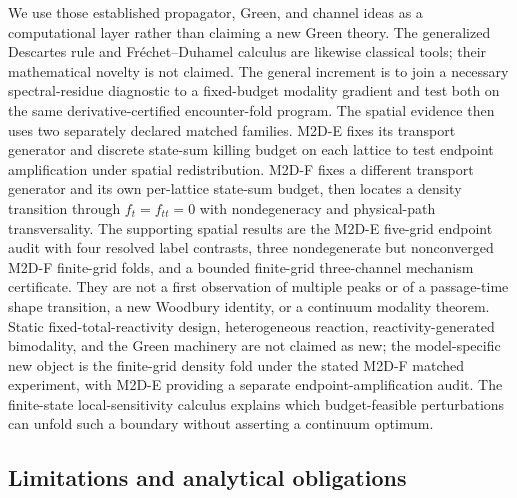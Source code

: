 \documentclass[aps,pre,reprint,amsmath,amssymb,longbibliography,floatfix]{revtex4-2}
\begin{document}
We use those established propagator, Green, and channel ideas as a
computational layer rather than claiming a new Green theory. The generalized
Descartes rule and Fr\'echet--Duhamel calculus are likewise classical tools;
their mathematical novelty is not claimed. The general increment is to join a
necessary spectral-residue diagnostic to a fixed-budget modality gradient and
test both on the same derivative-certified encounter-fold program. The
spatial evidence then uses two separately declared matched families. M2D-E fixes its
transport generator and discrete state-sum killing budget on each lattice to
test endpoint amplification under spatial redistribution. M2D-F fixes a
different transport generator and its own per-lattice state-sum budget, then
locates a density transition through
\(f_t=f_{tt}=0\) with nondegeneracy and physical-path transversality. The
supporting spatial results are the M2D-E five-grid endpoint audit with four
resolved label contrasts, three nondegenerate but nonconverged M2D-F
finite-grid folds, and a bounded finite-grid three-channel mechanism
certificate. They are not a first
observation of multiple peaks or of a passage-time shape transition, a new
Woodbury identity, or a continuum modality theorem. Static
fixed-total-reactivity design, heterogeneous reaction,
reactivity-generated bimodality, and the Green machinery are not claimed as
new; the model-specific new object is the finite-grid density fold under the
stated M2D-F matched experiment, with M2D-E providing a separate
endpoint-amplification audit. The finite-state local-sensitivity calculus explains which
budget-feasible perturbations can unfold such a boundary without asserting a
continuum optimum.

\subsection{Limitations and analytical obligations}
\label{sec:limitations}
\end{document}

